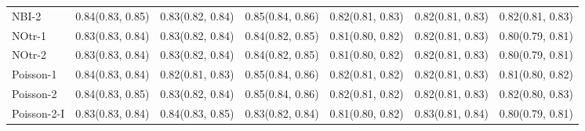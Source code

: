 \begin{tabularx}{\textwidth}{X p{} p{} p{} p{} p{} p{}}
NBI-2 & {0.84\newline(0.83, 0.85)} & {0.83\newline(0.82, 0.84)} & {0.85\newline(0.84, 0.86)} & {0.82\newline(0.81, 0.83)} & {0.82\newline(0.81, 0.83)} & {0.82\newline(0.81, 0.83)} \\
NOtr-1 & {0.83\newline(0.83, 0.84)} & {0.83\newline(0.82, 0.84)} & {0.84\newline(0.82, 0.85)} & {0.81\newline(0.80, 0.82)} & {0.82\newline(0.81, 0.83)} & {0.80\newline(0.79, 0.81)} \\
NOtr-2 & {0.83\newline(0.83, 0.84)} & {0.83\newline(0.82, 0.84)} & {0.84\newline(0.82, 0.85)} & {0.81\newline(0.80, 0.82)} & {0.82\newline(0.81, 0.83)} & {0.80\newline(0.79, 0.81)} \\
Poisson-1 & {0.84\newline(0.83, 0.84)} & {0.82\newline(0.81, 0.83)} & {0.85\newline(0.84, 0.86)} & {0.82\newline(0.81, 0.82)} & {0.82\newline(0.81, 0.83)} & {0.81\newline(0.80, 0.82)} \\
Poisson-2 & {0.84\newline(0.83, 0.85)} & {0.83\newline(0.82, 0.84)} & {0.85\newline(0.84, 0.86)} & {0.82\newline(0.81, 0.82)} & {0.82\newline(0.81, 0.83)} & {0.82\newline(0.80, 0.83)} \\
Poisson-2-I & {0.83\newline(0.83, 0.84)} & {0.84\newline(0.83, 0.85)} & {0.83\newline(0.82, 0.84)} & {0.81\newline(0.80, 0.82)} & {0.83\newline(0.81, 0.84)} & {0.80\newline(0.79, 0.81)} \\

\end{tabularx}
